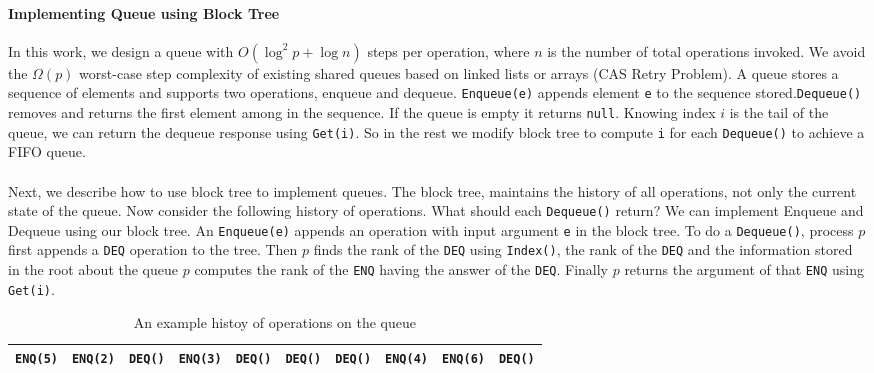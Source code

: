 \documentclass[10pt]{article}
\theoremstyle{definition}
\begin{document}
\paragraph{Implementing Queue using Block Tree}
In this work, we design a queue with $O(\log^2 p +\log n)$ steps per operation, where $n$ is the number of total operations invoked. We avoid the $\Omega(p)$ worst-case step complexity of existing shared queues based on linked lists or arrays (CAS Retry Problem). A queue stores a sequence of elements and supports two operations, enqueue and dequeue. \texttt{Enqueue(e)} appends element \texttt{e} to the sequence stored.\texttt{Dequeue()} removes and returns the first element among in the sequence. If the queue is empty it returns \texttt{null}. Knowing index $i$ is the tail of the queue, we can return the dequeue response using \texttt{Get(i)}.  So in the rest we modify block tree to compute \texttt{i} for each \texttt{Dequeue()} to achieve a FIFO queue.
%
\paragraph{}
Next, we describe how to use block tree to implement queues. The block tree, maintains the history of all operations, not only the current state of the queue. Now consider the following history of operations. What should each \texttt{Dequeue()} return? We can implement Enqueue and Dequeue using our block tree. An \texttt{Enqueue(e)} appends an operation with input argument \texttt{e} in the block tree. To do a \texttt{Dequeue()}, process $p$ first appends a \texttt{DEQ} operation to the tree. Then $p$ finds the rank of the \texttt{DEQ} using \texttt{Index()}, the rank of the \texttt{DEQ} and the information stored in the root about the queue $p$ computes the rank of  the \texttt{ENQ} having the answer of the \texttt{DEQ}. Finally $p$ returns the argument of that \texttt{ENQ} using \texttt{Get(i)}.

\begin{table}[hbt]
\centering
  \begin{tabular}{c|c|c|c|c|c|c|c|c|c}
    \hline \texttt{ENQ(5)}& \texttt{ENQ(2)}& \texttt{DEQ()}& \texttt{ENQ(3)}&\texttt{DEQ()}& \texttt{DEQ()}& \texttt{DEQ()}& \texttt{ENQ(4)}& \texttt{ENQ(6)}& \texttt{DEQ()}\\ \hline
  \end{tabular}
  \caption{An example histoy of operations on the queue}
\end{table}
\end{document}
